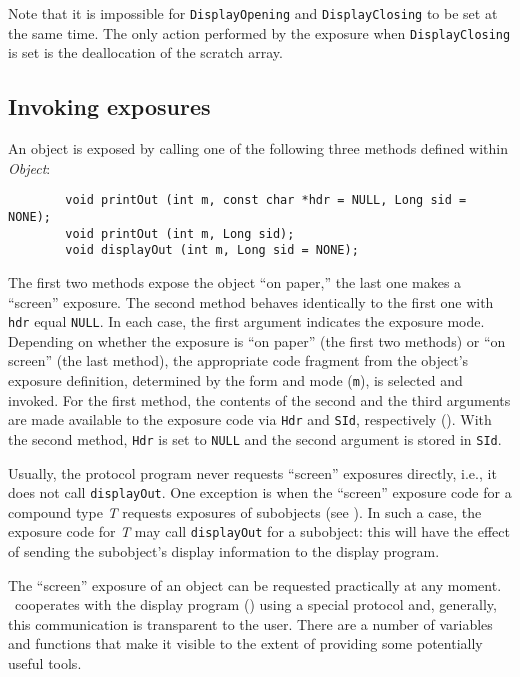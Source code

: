 Note that it is impossible for {\tt DisplayOpening} and {\tt DisplayClosing}
to be set at the same time.
The only action performed by the exposure when {\tt DisplayClosing} is set
is the deallocation of the scratch array.

\subsection{Invoking exposures}
\label{rm_ex_in}

An object is exposed by calling one of the following three methods defined
within {\em Object\/}:
\begin{verbatim}
        void printOut (int m, const char *hdr = NULL, Long sid = NONE);
        void printOut (int m, Long sid);
        void displayOut (int m, Long sid = NONE);
\end{verbatim}

The first two methods expose the object ``on paper,'' the last one
makes a ``screen'' exposure.
The second method behaves identically to the first one with {\tt hdr}
equal {\tt NULL}.
In each case, the first argument indicates the exposure mode.
Depending on whether the exposure is ``on paper'' (the first two methods) or
``on screen'' (the last method), the appropriate code fragment from the
object's exposure definition, determined
by the form and mode ({\tt m}), is selected and invoked.
For the first method, the contents of the second and the third arguments
are made available to the exposure code via {\tt Hdr} and {\tt SId},
respectively ().
With the second method, {\tt Hdr} is set to {\tt NULL} and the second
argument is stored in {\tt SId}.

Usually, the protocol program never requests ``screen'' exposures directly,
i.e., it does not call {\tt displayOut}.
One exception is when the ``screen'' exposure code for a compound type {\em T\/}
requests exposures of subobjects (see ).
In such a case, the exposure code for {\em T\/} may call {\tt displayOut} for
a subobject: this will have the effect of sending
the subobject's display information to the display program.

The ``screen'' exposure of an object can be requested practically
at any moment.
\smurph\ cooperates with the display program (\dsd)
using a special protocol
and, generally, this communication is transparent to the user.
There are a number of variables and functions that make it visible
to the extent of providing some potentially useful tools.

